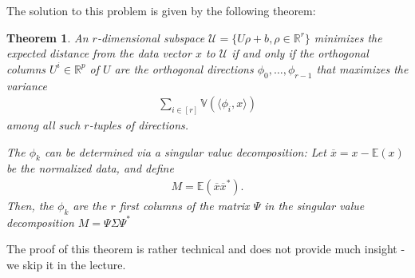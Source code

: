 \documentclass{article}
\newcommand{\erw}{\mathbb{E}} %
\newcommand{\sprod}[1]{\langle #1 \rangle}
\newcommand{\calU}{\mathcal{U}}
\newcommand{\R}{\mathbb{R}}
\newtheorem{theorem}{Theorem}
\begin{document}
The solution to this problem is given by the following theorem:

\begin{theorem} \label{th:svd}
   An $r$-dimensional subspace $\calU = \{U\rho+b, \rho \in \R^r\}$ minimizes the expected distance from the data vector $x$ to $\calU$ if and only if the orthogonal columns $U^i \in \R^p$ of $U$ are the orthogonal directions $\phi_0, \dots, \phi_{r-1}$ that maximizes the variance
   \begin{align} \label{eq:maxvar}
       \sum_{i \in [r]} \mathbb{V}(\sprod{\phi_i,x})
   \end{align}
   among all such $r$-tuples of directions.

   The $\phi_k$ can be determined via a singular value decomposition: Let $\overline{x}=x-\erw(x)$ be the normalized data, and define
   \begin{align*}
       M = \erw(\overline{x}\overline{x}^*).
   \end{align*}
    Then, the $\phi_k$ are the $r$ first columns of the matrix $\Psi$ in the singular value decomposition $M = \Psi \Sigma \Psi^*$
\end{theorem}

The proof of this theorem is rather technical and does not provide much insight - we skip it in the lecture.
\end{document}
